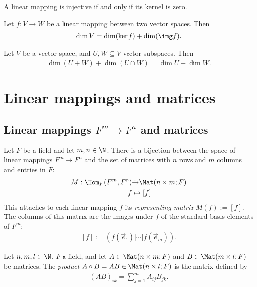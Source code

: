 \documentclass{article}
\begin{document}
\begin{lemma}[Notes 1.8.2]
	A linear mapping is injective if and only if its kernel is zero.
\end{lemma}

\begin{theorem}
	Let $f:V\to W$ be a linear mapping between two vector spaces. Then
	\begin{align*}
		\dim V = \dim(\ker f) + \dim(\img f).
	\end{align*}
\end{theorem}

\begin{corollary}
	Let $V$ be a vector space, and $U,W\subseteq V$ vector subspaces. Then
	\begin{align*}
		\dim(U+W)+\dim(U\cap W) = \dim U + \dim W.
	\end{align*}
\end{corollary}

\section{Linear mappings and matrices}

\subsection{Linear mappings $F^m\to F^n$ and matrices}

\begin{theorem}[Notes 2.1.1]
	Let $F$ be a field and let $m,n\in\N$. There is a bijection between the space of
	linear mappings $F^m\to F^n$ and the set of matrices with $n$ rows and $m$
	columns and entries in $F$:
	\begin{align*}
		M:\Hom_F(F^m,F^n) & \tilde\to\Mat(n\times m; F) \\
		f                 & \mapsto  \left[f\right]
	\end{align*}
	This attaches to each linear mapping $f$ its \emph{representing matrix
		$M(f):=\left[f\right]$}. The columns of this matrix are the images under $f$
	of the standard basis elements of $F^m$:
	\begin{align*}
		\left[f\right]:=(f(\vec e_1)|\cdots|f(\vec e_m)).
	\end{align*}
\end{theorem}

\begin{definition}
	Let $n,m,l\in\N$, $F$ a field, and let $A\in\Mat(n\times m; F)$ and
	$B\in\Mat(m\times l; F)$ be matrices. The \emph{product}
	$A\circ B=AB\in\Mat(n\times l; F)$ is the matrix defined by
	\begin{align*}
		(AB)_{ik} = \sum_{j=1}^m A_{ij}B_{jk}.
	\end{align*}
\end{definition}
\end{document}
